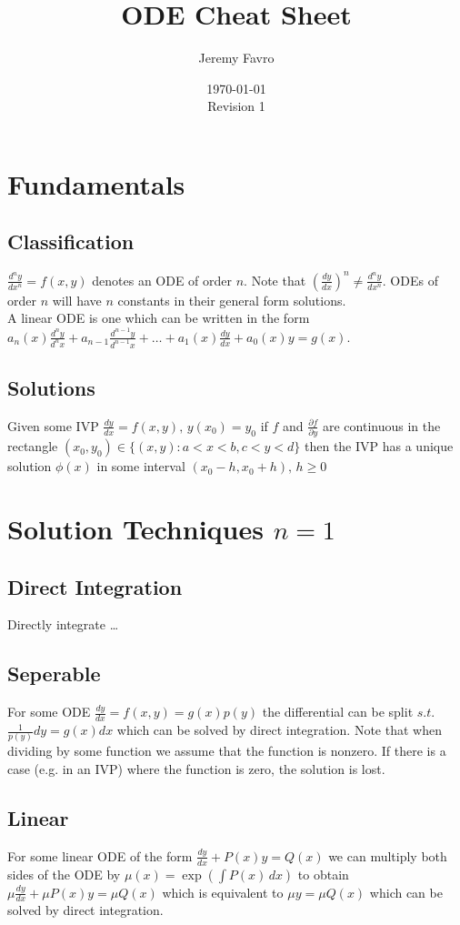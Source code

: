 \documentclass[10pt,landscape,letterpaper]{cheatsheet}
\title{ODE Cheat Sheet}
\author{Jeremy Favro}
\date{\today\\Revision 1}
\begin{document}
\maketitle

\section*{Fundamentals}
\subsection*{Classification}
$\frac{d^ny}{dx^n}=f(x,y)$ denotes an ODE of order $n$. Note that $(\frac{dy}{dx})^n\neq\frac{d^ny}{dx^n}$. ODEs of order $n$ will have $n$ constants in their general form solutions.\\
A linear ODE is one which can be written in the form $a_n(x)\frac{d^ny}{d^nx}+a_{n-1}\frac{d^{n-1}y}{d^{n-1}x}+\dots+a_1(x)\frac{dy}{dx}+a_0(x)y=g(x)$.\\
\subsection*{Solutions}
Given some IVP $\frac{dy}{dx}=f(x,y), \, y(x_0)=y_0$ if $f$ and $\frac{\partial f}{\partial y}$ are continuous in the rectangle $(x_0,y_0)\in \{(x,y):a<x<b,c<y<d\}$ then the
IVP has a unique solution $\phi(x)$ in some interval $(x_0-h,x_0+h), \, h\geq 0$


\section*{Solution Techniques $n=1$}
\subsection*{Direct Integration}
Directly integrate \dots
\subsection*{Seperable}
For some ODE $\frac{dy}{dx}=f(x,y)=g(x)p(y)$ the differential can be split $s.t.$ $\frac{1}{p(y)}dy=g(x)dx$ which can be solved by direct integration.
Note that when dividing by some function we assume that the function is nonzero. If there is a case (e.g. in an IVP) where the function is zero, the solution
is lost.
\subsection*{Linear}
For some linear ODE of the form $\frac{dy}{dx}+P(x)y=Q(x)$ we can multiply both sides of the ODE by $\mu(x)=\exp\left(\int P(x)\, dx\right)$
to obtain $\mu\frac{dy}{dx}+\mu P(x)y= \mu Q(x)$ which is equivalent to $\mu y=\mu Q(x)$ which can be solved by direct integration.
\end{document}
